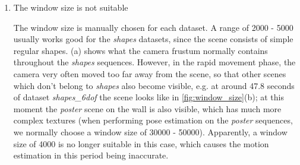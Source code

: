 \begin{enumerate}
\item The window size is not suitable

  The window size is manually chosen for each dataset. A range of
  \num{2000} - \num{5000} usually works good for the \textit{shapes}
  datasets, since the scene consists of simple regular
  shapes. (a) shows what the camera frustum
  normally contains throughout the \emph{shapes} sequences. However,
  in the rapid movement phase, the camera very often moved too far
  away from the scene, so that other scenes which don't belong to
  \textit{shapes} also become visible, e.g. at around 47.8 seconds of
  dataset \emph{shapes\_6dof} the scene looks like in
  \cref{fig:window_size}(b); at this moment the \emph{poster} scene on
  the wall is also visible, which has much more complex textures (when
  performing pose estimation on the \textit{poster} sequences, we
  normally choose a window size of \num{30000} -
  \num{50000}). Apparently, a window size of 4000 is no longer
  suitable in this case, which causes the motion estimation in this
  period being inaccurate.


\end{enumerate}
